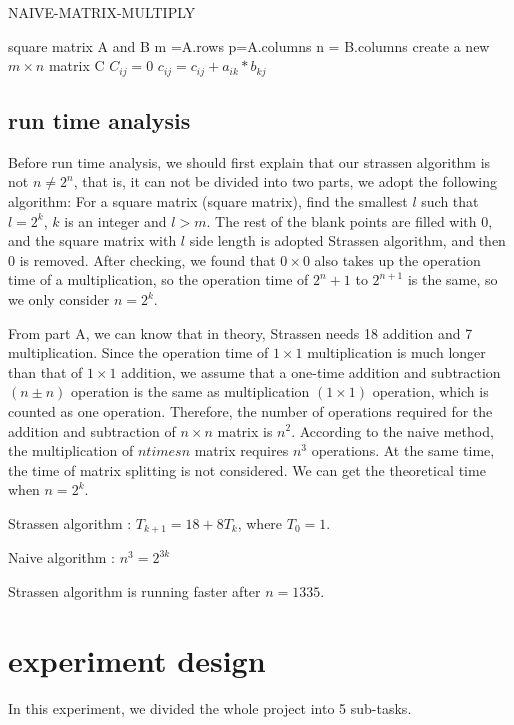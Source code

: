 \documentclass[journal]{IEEEtran}
\begin{document}
\begin{algorithm}[htb]  
  \caption{NAIVE-MATRIX-MULTIPLY}  
   
  \begin{algorithmic}  
    \Require  
    square matrix A and B 
    \State m =A.rows 
    \State p=A.columns
    \State n = B.columns
    \State create a new $m\times n$ matrix C
      \State $C_{ij}=0$
      \State $c_{ij}=c_{ij}+a_{ik}*b_{kj}$
      \EndFor  
      \EndFor
    \EndFor
  \end{algorithmic}  
\end{algorithm}


\subsection{run time analysis}
Before run time analysis, we should first explain that our strassen algorithm is not $n\neq 2^n$, that is, it can not be divided into two parts, we adopt the following algorithm:
For a square matrix (square matrix), find the smallest $l$ such that $l=2^k$, $k$ is an integer and $l>m$.
The rest of the blank points are filled with 0, and the square matrix with $l$ side length is adopted Strassen algorithm, and then 0 is removed.
After checking, we found that $0 \times 0$ also takes up the operation time of a multiplication, so the operation time of $2^n + 1$ to $2^{n+1}$ is the same, so we only consider $n=2^k$.


From part A, we can know that in theory, Strassen needs 18 addition and 7 multiplication.
Since the operation time of $1 \times 1$ multiplication is much longer than that of $1 \times 1$ addition, we assume that a one-time addition and subtraction $(n\pm n)$ operation is the same as multiplication $(1 \times 1)$ operation, which is counted as one operation.
Therefore, the number of operations required for the addition and subtraction of $n\times n$ matrix is $n^2$.
According to the naive method, the multiplication of $n times n$ matrix requires $n^3$ operations.
At the same time, the time of matrix splitting is not considered.
We can get the theoretical time when $n = 2^k$.


Strassen algorithm : $T_{k+1} = 18 +8T_k$, where $T_0=1$.


Naive algorithm : $n^3=2^{3k}$


Strassen algorithm is running faster after $n=1335$.

\section{experiment design}
In this experiment, we divided the whole project into 5 sub-tasks.
\end{document}
